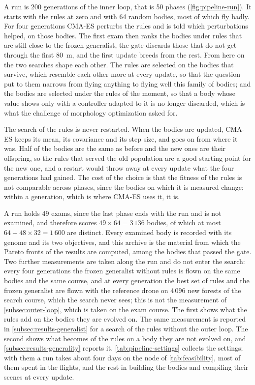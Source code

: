 A run is 200 generations of the inner loop, that is 50 phases (\autoref{fig:pipeline-run}). It starts with the rules at zero and with 64 random bodies, most of which fly badly. For four generations CMA-ES perturbs the rules and is told which perturbations helped, on those bodies. The first exam then ranks the bodies under rules that are still close to the frozen generalist, the gate discards those that do not get through the first 80~m, and the first update breeds from the rest. From here on the two searches shape each other. The rules are selected on the bodies that survive, which resemble each other more at every update, so that the question put to them narrows from flying anything to flying well this family of bodies; and the bodies are selected under the rules of the moment, so that a body whose value shows only with a controller adapted to it is no longer discarded, which is what the challenge of morphology optimization asked for.

The search of the rules is never restarted. When the bodies are updated, CMA-ES keeps its mean, its covariance and its step size, and goes on from where it was. Half of the bodies are the same as before and the new ones are their offspring, so the rules that served the old population are a good starting point for the new one, and a restart would throw away at every update what the four generations had gained. The cost of the choice is that the fitness of the rules is not comparable across phases, since the bodies on which it is measured change; within a generation, which is where CMA-ES uses it, it is.

A run holds 49 exams, since the last phase ends with the run and is not examined, and therefore scores $49 \times 64 = 3\,136$ bodies, of which at most $64 + 48 \times 32 = 1\,600$ are distinct. Every examined body is recorded with its genome and its two objectives, and this archive is the material from which the Pareto fronts of the results are computed, among the bodies that passed the gate. Two further measurements are taken along the run and do not enter the search: every four generations the frozen generalist without rules is flown on the same bodies and the same course, and at every generation the best set of rules and the frozen generalist are flown with the reference drone on 4\,096 new forests of the search course, which the search never sees; this is not the measurement of \autoref{subsec:outer-loop}, which is taken on the exam course. The first shows what the rules add on the bodies they are evolved on. The same measurement is reported in \autoref{subsec:results-generalist} for a search of the rules without the outer loop. The second shows what becomes of the rules on a body they are not evolved on, and \autoref{subsec:results-generality} reports it. \autoref{tab:pipeline-settings} collects the settings; with them a run takes about four days on the node of \autoref{tab:feasibility}, most of them spent in the flights, and the rest in building the bodies and compiling their scenes at every update.

